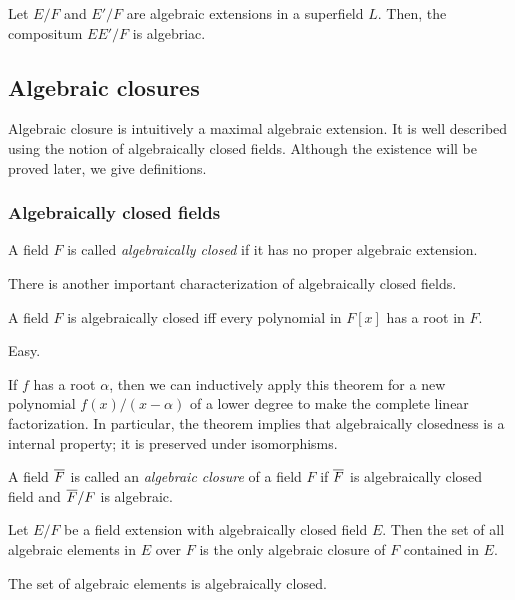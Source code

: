 \documentclass{../exp}
\begin{document}
\begin{thm}
Let $E/F$ and $E'/F$ are algebraic extensions in a superfield $L$.
Then, the compositum $EE'/F$ is algebriac.
\end{thm}
\begin{pf}
\end{pf}










\subsection{Algebraic closures}

Algebraic closure is intuitively a maximal algebraic extension.
It is well described using the notion of algebraically closed fields.
Although the existence will be proved later, we give definitions.

\subsubsection{Algebraically closed fields}
\begin{defn}
A field $F$ is called \emph{algebraically closed} if it has no proper algebraic extension.
\end{defn}

There is another important characterization of algebraically closed fields.

\begin{prop}
A field $F$ is algebraically closed iff every polynomial in $F[x]$ has a root in $F$.
\end{prop}
\begin{pf}
Easy.
\end{pf}

If $f$ has a root $\alpha$, then we can inductively apply this theorem for a new polynomial $f(x)/(x-\alpha)$ of a lower degree to make the complete linear factorization.
In particular, the theorem implies that algebraically closedness is a internal property; it is preserved under isomorphisms.

\begin{defn}
A field $\overline F$ is called an \emph{algebraic closure} of a field $F$ if $\overline F$ is algebraically closed field and $\overline F/F$ is algebraic.
\end{defn}


\begin{prop}
Let $E/F$ be a field extension with algebraically closed field $E$.
Then the set of all algebraic elements in $E$ over $F$ is the only algebraic closure of $F$ contained in $E$.
\end{prop}
\begin{pf}
The set of algebraic elements is algebraically closed.
\end{pf}
\end{document}
